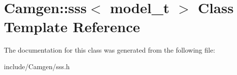 \hypertarget{a00503}{\section{Camgen\-:\-:sss$<$ model\-\_\-t $>$ Class Template Reference}
\label{a00503}
}


The documentation for this class was generated from the following file\-:\begin{DoxyCompactItemize}
\item 
include/\-Camgen/sss.\-h\end{DoxyCompactItemize}

